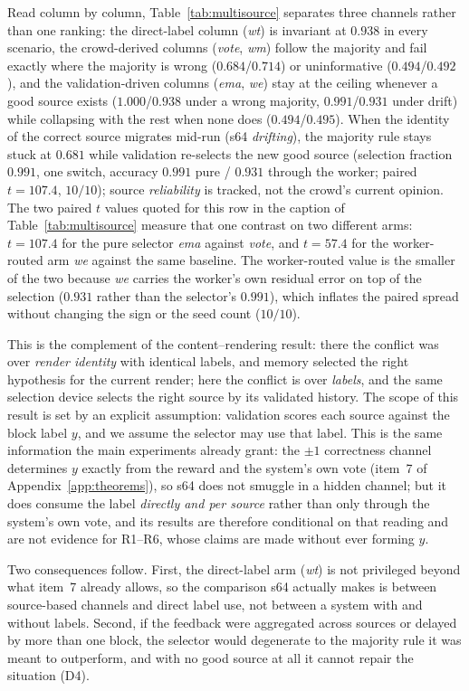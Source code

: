 \documentclass[preprint,12pt]{elsarticle}
\begin{document}
Read column by
column, Table~\ref{tab:multisource} separates three channels rather than one
ranking: the direct-label column (\textit{wt}) is invariant at $0.938$ in
every scenario, the crowd-derived columns (\textit{vote}, \textit{wm}) follow
the majority and fail exactly where the majority is wrong
($0.684$/$0.714$) or uninformative ($0.494$/$0.492$), and the
validation-driven columns (\textit{ema}, \textit{we}) stay at the ceiling
whenever a good source exists ($1.000$/$0.938$ under a wrong majority,
$0.991$/$0.931$ under drift) while collapsing with the rest when none does
($0.494$/$0.495$). When the identity of the correct
source migrates mid-run (s64 \emph{drifting}), the majority rule stays
stuck at $0.681$ while validation re-selects the new good source
(selection fraction $0.991$, one switch, accuracy $0.991$ pure / $0.931$
through the worker; paired $t=107.4$, $10/10$); source
\emph{reliability} is tracked, not the crowd's current opinion. The two
paired $t$ values quoted for this row in the caption of
Table~\ref{tab:multisource} measure that one contrast on two different arms:
$t=107.4$ for the pure selector \textit{ema} against \textit{vote}, and
$t=57.4$ for the worker-routed arm \textit{we} against the same baseline.
The worker-routed value is the smaller of the two because \textit{we} carries
the worker's own residual error on top of the selection ($0.931$ rather than
the selector's $0.991$), which inflates the paired spread without changing
the sign or the seed count ($10/10$).

This is
the complement of the content--rendering result: there the conflict was
over \emph{render identity} with identical labels, and memory selected the
right hypothesis for the current render; here the conflict is over
\emph{labels}, and the same selection device selects the right source by
its validated history. The scope of this result is set by an explicit
assumption: validation scores each source against the block
label $y$, and we assume the selector may use that label. This is the same
information the main experiments already grant: the $\pm1$ correctness
channel determines $y$ exactly from the reward and the system's own vote
(item~7 of Appendix~\ref{app:theorems}), so s64 does not smuggle in a
hidden channel; but it does consume the label \emph{directly and per
source} rather than only through the system's own vote, and its results are
therefore conditional on that reading and are not evidence for R1--R6,
whose claims are made without ever forming $y$.

Two consequences follow.
First, the direct-label arm (\textit{wt}) is not privileged beyond what
item~7 already allows, so the comparison s64 actually makes is between
source-based channels and direct label use, not between a system with and
without labels. Second, if the feedback were aggregated across sources or
delayed by more than one block, the selector would degenerate to the
majority rule it was meant to outperform, and with no good source at all it
cannot repair the situation (D4).
\end{document}
